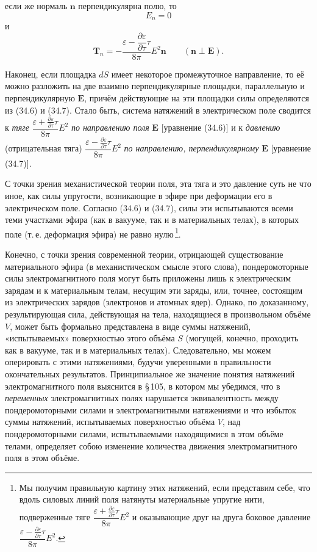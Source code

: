\documentclass[a4paper,12pt]{article}
\begin{document}
если же нормаль $\mathbf{n}$ перпендикулярна полю, то
$$
    E_n = 0
$$
и
\begin{equation}
    \mathbf{T}_n = -\frac{\varepsilon - \dfrac{\partial\varepsilon}{\partial\tau}\tau}{8\pi}
                   E^2\mathbf{n}
    \qquad (\mathbf{n} \perp \mathbf{E}).
    \tag{34.7}
\end{equation}

Наконец, если площадка $dS$ имеет некоторое промежуточное направление,
то её можно разложить на две взаимно перпендикулярные площадки,
параллельную и перпендикулярную $\mathbf{E}$, причём действующие на
эти площадки силы определяются из (34.6) и (34.7). Стало быть, система
натяжений в электрическом поле сводится к \textit{тяге}
$\dfrac{\varepsilon + \frac{\partial\varepsilon}{\partial\tau}\tau}{8\pi}E^2$
\textit{по направлению поля} $\mathbf{E}$ [уравнение (34.6)] и к
\textit{давлению} (отрицательная тяга)
$\dfrac{\varepsilon - \frac{\partial\varepsilon}{\partial\tau}\tau}{8\pi}E^2$
\textit{по направлению, перпендикулярному} $\mathbf{E}$ [уравнение (34.7)].

С точки зрения механистической теории поля, эта тяга и это давление
суть не что иное, как силы упругости, возникающие в эфире при
деформации его в электрическом поле. Согласно (34.6) и (34.7), силы
эти испытываются всеми теми участками эфира (как в вакууме, так и
в материальных телах), в которых поле (т.\,е. деформация эфира) не
равно нулю\,\footnote{Мы получим правильную картину этих натяжений,
если представим себе, что вдоль силовых линий поля натянуты
материальные упругие нити, подверженные тяге
$\dfrac{\varepsilon + \frac{\partial\varepsilon}{\partial\tau}\tau}{8\pi}E^2$
и оказывающие друг на друга боковое давление
$\dfrac{\varepsilon - \frac{\partial\varepsilon}{\partial\tau}\tau}{8\pi}E^2$.}.


Конечно, с точки зрения современной теории, отрицающей существование
материального эфира (в механистическом смысле этого слова),
пондеромоторные силы электромагнитного поля могут быть приложены лишь
к электрическим зарядам и к материальным телам, несущим эти заряды,
или, точнее, состоящим из электрических зарядов (электронов и атомных
ядер). Однако, по доказанному, результирующая сила, действующая на
тела, находящиеся в произвольном объёме $V$, может быть формально
представлена в виде суммы натяжений, «испытываемых» поверхностью этого
объёма $S$ (могущей, конечно, проходить как в вакууме, так и
в материальных телах). Следовательно, мы можем оперировать с этими
натяжениями, будучи уверенными в правильности окончательных результатов.
Принципиальное же значение понятия натяжений электромагнитного поля
выяснится в §\,105, в котором мы убедимся, что в \textit{переменных}
электромагнитных полях нарушается эквивалентность между пондеромоторными
силами и электромагнитными натяжениями и что избыток суммы натяжений,
испытываемых поверхностью объёма $V$, над пондеромоторными силами,
испытываемыми находящимися в этом объёме телами, определяет собою
изменение количества движения электромагнитного поля в этом объёме.
\end{document}
